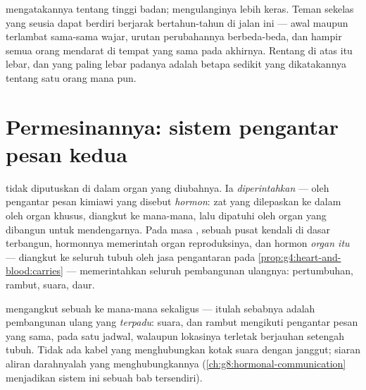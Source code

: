 \begin{remark}\label{rem:g8:puberty:timetable}
 mengatakannya tentang tinggi
badan;  mengulanginya lebih keras. Teman sekelas
yang seusia dapat berdiri berjarak bertahun-tahun di jalan
ini --- awal maupun terlambat sama-sama wajar, urutan
perubahannya berbeda-beda, dan hampir semua orang mendarat
di tempat yang sama pada akhirnya. Rentang di atas itu
lebar, dan yang paling lebar padanya adalah betapa sedikit
yang dikatakannya tentang satu orang mana pun.
\end{remark}

\section{Permesinannya: sistem pengantar pesan kedua}

\begin{definition}\label{def:g8:puberty:hormones}
 tidak diputuskan di dalam organ yang diubahnya. Ia
\emph{diperintahkan} --- oleh pengantar pesan kimiawi yang
disebut \emph{hormon}: zat yang dilepaskan ke
dalam \emph{} oleh organ khusus, diangkut ke
mana-mana, lalu dipatuhi oleh organ yang dibangun untuk
mendengarnya. Pada masa , sebuah pusat kendali di
dasar  terbangun, hormonnya memerintah organ
reproduksinya, dan hormon \emph{organ itu} --- diangkut ke
seluruh tubuh oleh jasa pengantaran pada
\cref{prop:g4:heart-and-blood:carries} --- memerintahkan
seluruh pembangunan ulangnya: pertumbuhan, rambut, suara,
daur.
\end{definition}

\begin{example}\label{ex:g8:puberty:sites}
 mengangkut sebuah  ke mana-mana sekaligus ---
itulah sebabnya  adalah pembangunan ulang yang
\emph{terpadu}: suara,  dan rambut mengikuti pengantar
pesan yang sama, pada satu jadwal, walaupun lokasinya
terletak berjauhan setengah tubuh. Tidak ada kabel 
yang menghubungkan kotak suara dengan janggut; siaran aliran
darahnyalah yang menghubungkannya
(\cref{ch:g8:hormonal-communication} menjadikan sistem ini
sebuah bab tersendiri).
\end{example}

